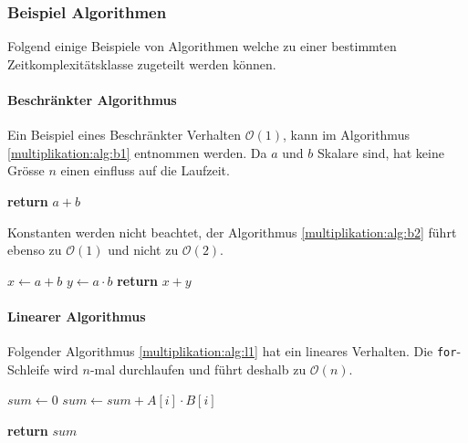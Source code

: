 \subsubsection{Beispiel Algorithmen}

Folgend einige Beispiele von Algorithmen welche zu einer bestimmten Zeitkomplexit\"atsklasse zugeteilt werden k\"onnen.
\paragraph{Beschr\"ankter Algorithmus}

Ein Beispiel eines Beschr\"ankter Verhalten $\mathcal{O}(1)$, kann im Algorithmus \ref{multiplikation:alg:b1} entnommen werden. Da $a$ und $b$ Skalare sind, hat keine Gr\"osse $n$ einen einfluss auf die Laufzeit.

\begin{algorithm}\footnotesize\caption{}
	\label{multiplikation:alg:b1}
	\setlength{\lineskip}{7pt}
	\begin{algorithmic}
		\State \textbf{return} $a+b$
		\EndFunction
	\end{algorithmic}
\end{algorithm}

Konstanten werden nicht beachtet, der Algorithmus \ref{multiplikation:alg:b2} f\"uhrt ebenso zu  $\mathcal{O}(1)$ und nicht zu $\mathcal{O}(2)$.


\begin{algorithm}\footnotesize\caption{}
	\label{multiplikation:alg:b2}
	\setlength{\lineskip}{7pt}
	\begin{algorithmic}
		\Function{B2}{$a, b$}
		\State $ x \gets a+b $
		\State $ y \gets a \cdot b $
		\State \textbf{return} $x+y$
		\EndFunction
	\end{algorithmic}
\end{algorithm}

\paragraph{Linearer Algorithmus}

Folgender Algorithmus \ref{multiplikation:alg:l1} hat ein lineares Verhalten.
Die \texttt{for}-Schleife wird $n$-mal durchlaufen und f\"uhrt deshalb zu $\mathcal{O}(n)$.

\begin{algorithm}\footnotesize\caption{}
	\setlength{\lineskip}{7pt}
	\begin{algorithmic}
		\label{multiplikation:alg:l1}
		\Function{L}{$\mathbf{a}, \mathbf{b}$,n}
		\State $ sum \gets 0$
		\For{$i = 0,1,2 \dots,n$}
		\State $ sum \gets sum + A[i] \cdot B[i] $
		\EndFor
		
		\State \textbf{return} $sum$
		
		\EndFunction
	\end{algorithmic}
\end{algorithm}

